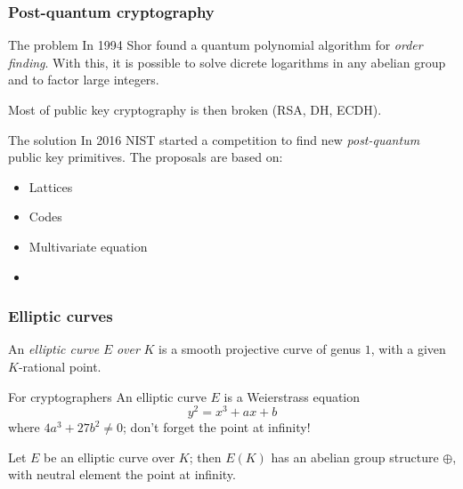 \documentclass{beamer}
\begin{document}
    \begin{frame}
        \frametitle{Post-quantum cryptography}
        
        \begin{block}{The problem}
            In 1994 Shor found a quantum polynomial algorithm for \emph{order finding}. With this, it is possible to solve dicrete logarithms in any abelian group and to factor large integers.
            
            Most of public key cryptography is then broken (RSA, DH, ECDH).
        \end{block}
    
        \pause
        \begin{block}{The solution}
            In 2016 NIST started a competition to find new \emph{post-quantum} public key primitives. The proposals are based on:
            \begin{itemize}
                \item Lattices
                \item Codes
                \item Multivariate equation
                \item {}
            \end{itemize}
        \end{block}
    \end{frame}

    \begin{frame}
        \frametitle{Elliptic curves}
        
        \begin{definition}
            An \emph{elliptic curve} $E$ \emph{over} $K$ is a smooth projective curve of genus $1$, with a given $K$-rational point.
        \end{definition}
    
        \begin{block}{For cryptographers}
            An elliptic curve $E$ is a Weierstrass equation $$y^2=x^3+ax+b$$ where $4a^3+27b^2\neq0$; don't forget the point at infinity!
        \end{block}
    
        \begin{theorem}
            Let $E$ be an elliptic curve over $K$; then $E(K)$ has an abelian group structure $\oplus$, with neutral element the point at infinity.
        \end{theorem}
    \end{frame}
\end{document}
